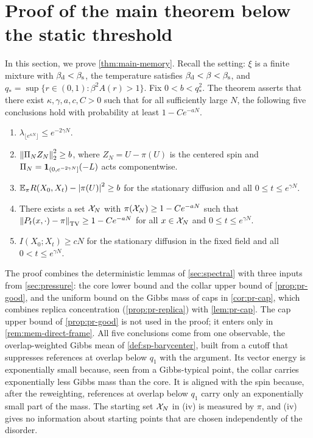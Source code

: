 \chapter{Proof of the main theorem below the static threshold}\label{sec:memory}

In this section, we prove \cref{thm:main-memory}. Recall the setting: $\xi$ is a finite mixture with $\beta_{\mathrm d}<\beta_{\mathrm s}$, the temperature satisfies $\beta_{\mathrm d}<\beta<\beta_{\mathrm s}$, and $q_*=\sup\{r\in(0,1):\beta^2A(r)>1\}$. Fix $0<b<q_*^2$. The theorem asserts that there exist $\kappa,\gamma,a,c,C>0$ such that for all sufficiently large $N$, the following five conclusions hold with probability at least $1-Ce^{-aN}$.
\begin{enumerate}[label=(\roman*)]
\item $\lambda_{\lfloor e^{\kappa N}\rfloor}\le e^{-2\gamma N}$.
\item $\left\lVert\Pi_NZ_N\right\rVert_2^2\ge b$, where $Z_N=U-\pi(U)$ is the centered spin and $\Pi_N=\mathbf 1_{(0,e^{-2\gamma N}]}(-L)$ acts componentwise.
\item $\mathbb E_\pi R(X_0,X_t)-\left|\pi(U)\right|^2\ge b$ for the stationary diffusion and all $0\le t\le e^{\gamma N}$.
\item There exists a set $\mathcal X_N$ with $\pi(\mathcal X_N)\ge1-Ce^{-aN}$ such that $\left\lVert P_t(x,\cdot)-\pi\right\rVert_{\mathrm{TV}}\ge1-Ce^{-aN}$ for all $x\in\mathcal X_N$ and $0\le t\le e^{\gamma N}$.
\item $I(X_0;X_t)\ge cN$ for the stationary diffusion in the fixed field and all $0<t\le e^{\gamma N}$.
\end{enumerate}

The proof combines the deterministic lemmas of \cref{sec:spectral} with three inputs from \cref{sec:pressure}: the core lower bound and the collar upper bound of \cref{prop:pr-good}, and the uniform bound on the Gibbs mass of caps in \cref{cor:pr-cap}, which combines replica concentration (\cref{prop:pr-replica}) with \cref{lem:pr-cap}. The cap upper bound of \cref{prop:pr-good} is not used in the proof; it enters only in \cref{rem:mem-direct-frame}. All five conclusions come from one observable, the overlap-weighted Gibbs mean of \cref{def:sp-barycenter}, built from a cutoff that suppresses references at overlap below $q_1$ with the argument. Its vector energy is exponentially small because, seen from a Gibbs-typical point, the collar carries exponentially less Gibbs mass than the core. It is aligned with the spin because, after the reweighting, references at overlap below $q_1$ carry only an exponentially small part of the mass. The starting set $\mathcal X_N$ in (iv) is measured by $\pi$, and (iv) gives no information about starting points that are chosen independently of the disorder.

